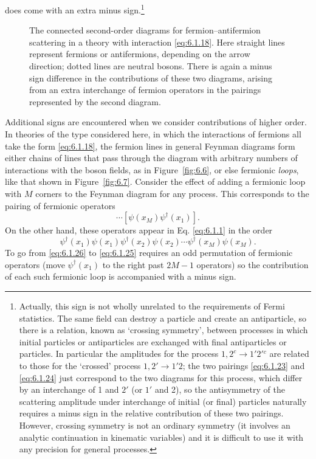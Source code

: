 does come with an extra minus sign.\footnote{Actually, this sign is not wholly
unrelated to the requirements of Fermi statistics. The same field can destroy
a particle and create an antiparticle, so there is a relation, known as
`crossing symmetry', between processes in which initial particles or
antiparticles are exchanged with final antiparticles or particles. In
particular the amplitudes for the process $1,2^c\to1'2'{}^c$ are related to
those for the `crossed' process $1,2'\to1'2$; the two pairings \eqref{eq:6.1.23} and
\eqref{eq:6.1.24} just correspond to the two diagrams for this process, which differ by
an interchange of 1 and $2'$ (or $1'$ and 2), so the antisymmetry of the
scattering amplitude under interchange of initial (or final) particles
naturally requires a minus sign in the relative contribution of these two
pairings. However, crossing symmetry is not an ordinary symmetry (it involves
an analytic continuation in kinematic variables) and it is difficult to use it
with any precision for general processes.}

\begingroup
\renewcommand{\thefigure}{6.\arabic{figure}}
\setcounter{figure}{4}
\begin{figure}[htbp]

\caption{The connected second-order diagrams for fermion--antifermion
scattering in a theory with interaction \eqref{eq:6.1.18}. Here straight lines
represent fermions or antifermions, depending on the arrow direction; dotted
lines are neutral bosons. There is again a minus sign difference in the
contributions of these two diagrams, arising from an extra interchange of
fermion operators in the pairings represented by the second diagram.}
\label{fig:6.5}
\end{figure}
\endgroup

Additional signs are encountered when we consider contributions of higher
order. In theories of the type considered here, in which the interactions of
fermions all take the form \eqref{eq:6.1.18}, the fermion lines in general Feynman
diagrams form either chains of lines that pass through the diagram with
arbitrary numbers of interactions with the boson fields, as in Figure~\ref{fig:6.6}, or
else fermionic \emph{loops}, like that shown in Figure~\ref{fig:6.7}. Consider the effect
of adding a fermionic loop with $M$ corners to the Feynman diagram for any
process. This corresponds to the pairing of fermionic operators
\begin{equation}
[\psi(x_1)\psi^\dagger(x_2)]
[\psi(x_2)\psi^\dagger(x_3)]\cdots
[\psi(x_M)\psi^\dagger(x_1)].
\tag{6.1.25}
\label{eq:6.1.25}
\end{equation}
On the other hand, these operators appear in Eq. \eqref{eq:6.1.1} in the order
\begin{equation}
\psi^\dagger(x_1)\psi(x_1)\psi^\dagger(x_2)\psi(x_2)\cdots
 \psi^\dagger(x_M)\psi(x_M).
\tag{6.1.26}
\label{eq:6.1.26}
\end{equation}
To go from \eqref{eq:6.1.26} to \eqref{eq:6.1.25} requires an odd permutation of fermionic
operators (move $\psi^\dagger(x_1)$ to the right past $2M-1$ operators) so the
contribution of each such fermionic loop is accompanied with a minus sign.

